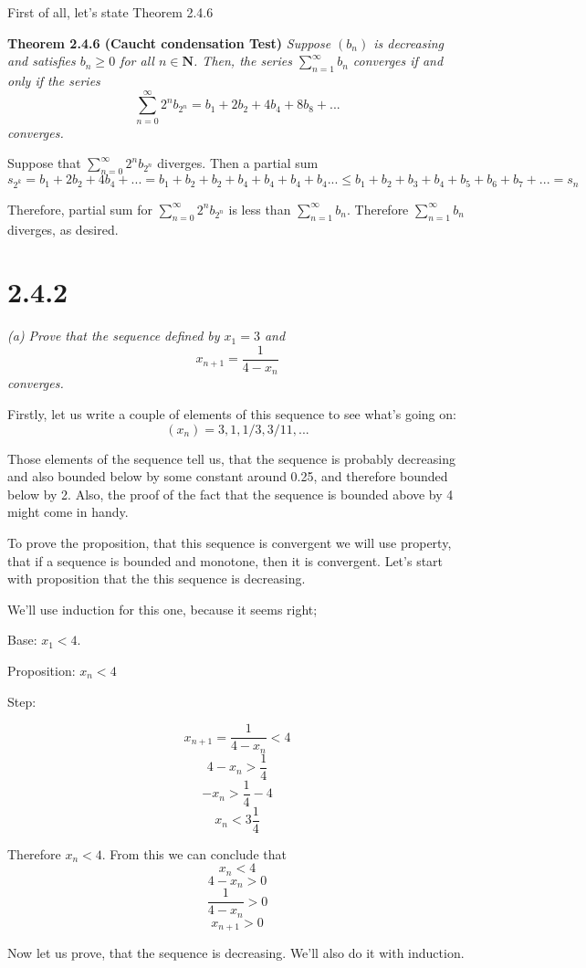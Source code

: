 \documentclass[11pt,oneside,titlepage]{article}
\begin{document}
First of all, let's state Theorem 2.4.6

\textbf{Theorem 2.4.6 (Caucht condensation Test)}
\textit{Suppose $(b_n)$ is decreasing and satisfies $b_n \geq 0$ for all
  $n \in \textbf{N}$. Then, the series $\sum_{n = 1}^{\infty}b_n$ converges
  if and only if the series }
$$\sum_{n = 0}^{\infty}2^n b_{2^n} = b_1 + 2 b_2 + 4 b_4 + 8 b_8 + ...$$
\textit{converges.}

Suppose that $\sum^{\infty}_{n = 0} 2^n b_{2^n}$ diverges. Then a partial
sum
$$s_{2^k} = b_1 + 2 b_2 + 4 b_4 + ... =
b_1 + b_2 + b_2 + b_4 + b_4 + b_4 + b_4 ... \leq
b_1 + b_2 + b_3 + b_4 + b_5 + b_6 + b_7 + ... = s_n $$

Therefore, partial sum for $\sum^{\infty}_{n = 0} 2^n b_{2^n}$ is less than
$\sum^{\infty}_{n = 1} b_n$. Therefore $\sum^{\infty}_{n = 1} b_n$ diverges,
as desired.

\section*{2.4.2}
\textit{(a) Prove that the sequence defined by $x_1 = 3$ and}
$$x_{n + 1} = \frac{1}{4 - x_n}$$
\textit{converges.}



Firstly, let us write a couple of elements of this sequence to see what's going on:
$$(x_n) = 3, 1, 1/3, 3/11, ...$$

Those elements of the sequence tell us, that the sequence is probably decreasing
and also bounded below by some constant around 0.25, and therefore bounded below
by 2. Also, the proof of the fact that the sequence is bounded above by 4 might
come in handy.

To prove the proposition, that this sequence  is convergent we will
use property, that if a sequence is bounded and monotone, then it is convergent.
Let's start with proposition that the this sequence is decreasing.

We'll use induction for this one, because it seems right;

Base: $x_1 < 4$.

Proposition: $x_n < 4$

Step:

$$x_{n + 1} = \frac{1}{4 - x_n} < 4$$
$$4 - x_n > \frac{1}{4}$$
$$- x_n > \frac{1}{4} - 4$$
$$x_n < 3\frac{1}{4}$$

Therefore $x_n < 4$. From this we can conclude that 
$$x_n < 4$$
$$4 - x_n > 0$$
$$\frac{1}{4 - x_n} > 0$$
$$x_{n + 1} > 0$$

Now let us prove, that the sequence is decreasing. We'll also do it with induction.
\end{document}
